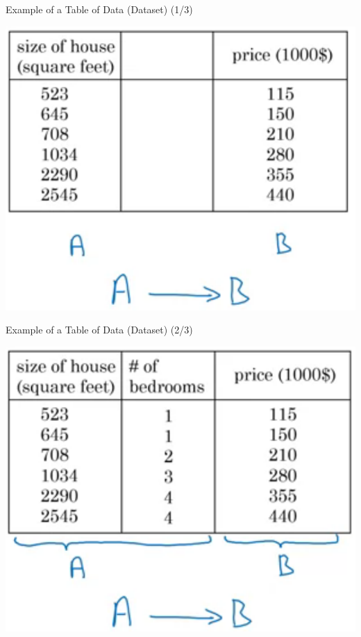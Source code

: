 \documentclass[pdf]{beamer}
\theoremstyle{mystyle}
\begin{document}
\begin{frame}{Example of a Table of Data (Dataset) (1/3)}
	\begin{table}[!ht]
		\centering
		\includegraphics[scale=.3]{example-dataset-2}
		\caption{House prices dataset~\citep{ng2019AIForEveryone}}
		\label{fig:example-dataset-2}
	\end{table}
\end{frame}

\begin{frame}{Example of a Table of Data (Dataset) (2/3)}
	\begin{table}[!ht]
		\centering
		\includegraphics[scale=.3]{example-dataset-1}
		\caption{House prices dataset~\citep{ng2019AIForEveryone}}
		\label{fig:example-dataset-1}
	\end{table}
\end{frame}
\end{document}

